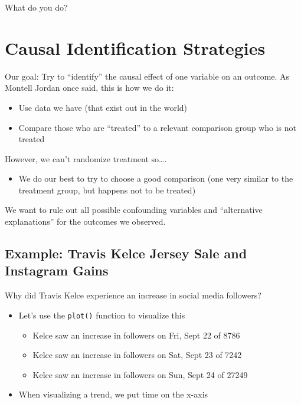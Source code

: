 \documentclass[
  letterpaper,
  DIV=11,
  numbers=noendperiod]{scrreprt}
\providecommand{\tightlist}{%
  \setlength{\itemsep}{0pt}\setlength{\parskip}{0pt}}\usepackage{longtable,booktabs,array}
\begin{document}
What do you do?

\hypertarget{causal-identification-strategies}{%
\section{Causal Identification
Strategies}\label{causal-identification-strategies}}

Our goal: Try to ``identify'' the causal effect of one variable on an
outcome. As Montell Jordan once said, this is how we do it:

\begin{itemize}
\tightlist
\item
  Use data we have (that exist out in the world)
\item
  Compare those who are ``treated'' to a relevant comparison group who
  is not treated
\end{itemize}

However, we can't randomize treatment so\ldots.

\begin{itemize}
\tightlist
\item
  We do our best to try to choose a good comparison (one very similar to
  the treatment group, but happens not to be treated)
\end{itemize}

We want to rule out all possible confounding variables and ``alternative
explanations'' for the outcomes we observed.

\hypertarget{example-travis-kelce-jersey-sale-and-instagram-gains}{%
\subsection{Example: Travis Kelce Jersey Sale and Instagram
Gains}\label{example-travis-kelce-jersey-sale-and-instagram-gains}}

Why did Travis Kelce experience an increase in social media followers?

\begin{itemize}
\tightlist
\item
  Let's use the \texttt{plot()} function to visualize this

  \begin{itemize}
  \tightlist
  \item
    Kelce saw an increase in followers on Fri, Sept 22 of 8786
  \item
    Kelce saw an increase in followers on Sat, Sept 23 of 7242
  \item
    Kelce saw an increase in followers on Sun, Sept 24 of 27249
  \end{itemize}
\item
  When visualizing a trend, we put time on the x-axis
\end{itemize}
\end{document}
